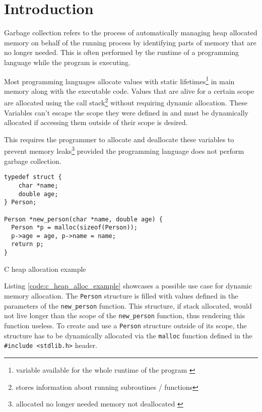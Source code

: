 \section{Introduction}

Garbage collection refers to the process of automatically managing
heap allocated memory on behalf of the running process by
identifying parts of memory that are no longer needed. \cite[Introduction]{go_gcguide_2022}
This is often performed by the runtime of a programming language while the
program is executing. \cite[Introduction]{go_spec_2023}

Most programming languages allocate values with static
lifetimes\footnote{variable available for the whole runtime of the program
\cite[Abstract]{static-dynamic-scope_tanter_2009}} in main memory along with
the executable code. Values that are alive for a certain scope are allocated
using the call stack\footnote{stores information about running subroutines /
functions\cite[2.2 Call Stacks]{call-stack_mcmaster-memon_2006}} without
requiring dynamic allocation. These Variables can't escape the scope they were
defined in and must be dynamically allocated if accessing them outside of
their scope is desired.

This requires the programmer to allocate and deallocate these
variables to prevent memory leaks\footnote{allocated no longer needed memory
not deallocated \cite[1.2.1 A Practical Object Ownership
Model]{practical_heine-lam_2003}} provided the programming language does not
perform garbage collection. 

\begin{listing}[H] 
    \begin{verbatim} 
typedef struct { 
    char *name;
    double age; 
} Person;

Person *new_person(char *name, double age) {
  Person *p = malloc(sizeof(Person));
  p->age = age, p->name = name;
  return p;
}
    \end{verbatim}
    \caption{C heap allocation example}
    \label{code:c_heap_alloc_example}
\end{listing}

Listing \autoref{code:c_heap_alloc_example} showcases a possible use case for
dynamic memory allocation. The \texttt{Person} structure is filled with values
defined in the parameters of the \texttt{new\_person} function. This structure,
if stack allocated, would not live longer than the scope of the
\texttt{new\_person} function, thus rendering this function useless. To create
and use a \texttt{Person} structure outside of its scope, the structure has to
be dynamically allocated via the \texttt{malloc} function defined in the
\texttt{#include <stdlib.h>} header.

